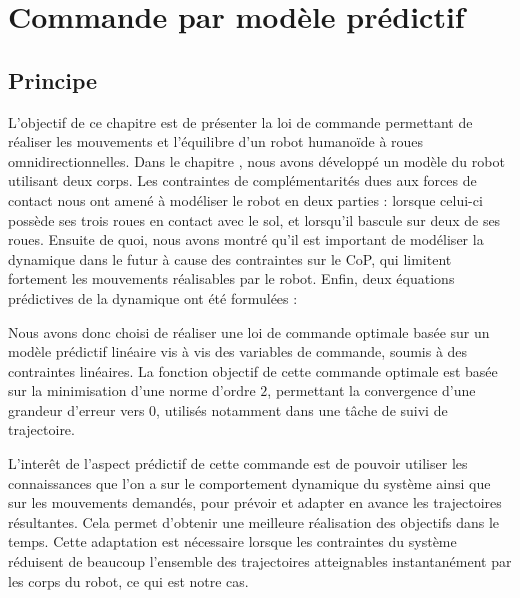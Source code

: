\chapter{Commande par modèle prédictif}
\label{chapitre.commande}
	\section{Principe}
	
		L'objectif de ce chapitre est de présenter la loi de commande permettant de réaliser les mouvements et l'équilibre d'un robot humanoïde à roues omnidirectionnelles.
		Dans le chapitre , nous avons développé un modèle du robot utilisant deux corps.
		Les contraintes de complémentarités dues aux forces de contact nous ont amené à modéliser le robot en deux parties : lorsque celui-ci possède ses trois roues en contact avec le sol, et lorsqu'il bascule sur deux de ses roues.
		Ensuite de quoi, nous avons montré qu'il est important de modéliser la dynamique dans le futur à cause des contraintes sur le CoP, qui limitent fortement les mouvements réalisables par le robot.
		Enfin, deux équations prédictives de la dynamique ont été formulées :
		
		Nous avons donc choisi de réaliser une loi de commande optimale basée sur un modèle prédictif linéaire vis à vis des variables de commande, soumis à des contraintes linéaires.
		La fonction objectif de cette commande optimale est basée sur la minimisation d'une norme d'ordre $2$, permettant la convergence d'une grandeur d'erreur vers $0$, utilisés notamment dans une tâche de suivi de trajectoire.
		
		L'interêt de l'aspect prédictif de cette commande est de pouvoir utiliser les connaissances que l'on a sur le comportement dynamique du système ainsi que sur les mouvements demandés, pour prévoir et adapter en avance les trajectoires résultantes.
		Cela permet d'obtenir une meilleure réalisation des objectifs dans le temps. 
		Cette adaptation est nécessaire lorsque les contraintes du système réduisent de beaucoup l'ensemble des trajectoires atteignables instantanément par les corps du robot, ce qui est notre cas.
	
